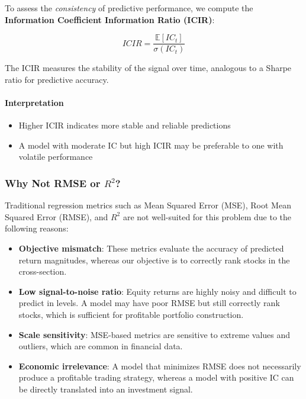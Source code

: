 \documentclass[11pt]{article}
\begin{document}
To assess the \textit{consistency} of predictive performance, we compute the \textbf{Information Coefficient Information Ratio (ICIR)}:

\[
ICIR = \frac{\mathbb{E}[IC_t]}{\sigma(IC_t)}
\]

The ICIR measures the stability of the signal over time, analogous to a Sharpe ratio for predictive accuracy.

\paragraph{Interpretation}
\begin{itemize}
    \item Higher ICIR indicates more stable and reliable predictions
    \item A model with moderate IC but high ICIR may be preferable to one with volatile performance
\end{itemize}

\subsubsection{Why Not RMSE or $R^2$?}

Traditional regression metrics such as Mean Squared Error (MSE), Root Mean Squared Error (RMSE), and $R^2$ are not well-suited for this problem due to the following reasons:

\begin{itemize}
    \item \textbf{Objective mismatch}: These metrics evaluate the accuracy of predicted return magnitudes, whereas our objective is to correctly rank stocks in the cross-section.

    \item \textbf{Low signal-to-noise ratio}: Equity returns are highly noisy and difficult to predict in levels. A model may have poor RMSE but still correctly rank stocks, which is sufficient for profitable portfolio construction.

    \item \textbf{Scale sensitivity}: MSE-based metrics are sensitive to extreme values and outliers, which are common in financial data.

    \item \textbf{Economic irrelevance}: A model that minimizes RMSE does not necessarily produce a profitable trading strategy, whereas a model with positive IC can be directly translated into an investment signal.
\end{itemize}
\end{document}
